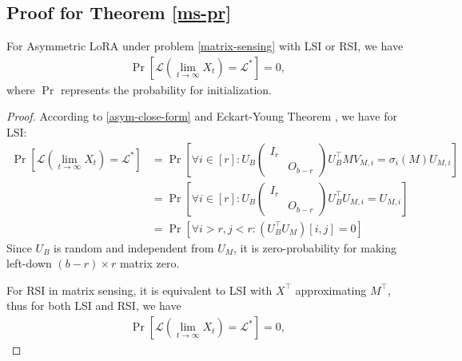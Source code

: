 \subsection{Proof for Theorem \ref{ms-pr}}
\label{ms-pr-proof}
\begin{theorem}
    For Asymmetric LoRA under problem \ref{matrix-sensing} with LSI or RSI, we have
    \begin{align*}
        \operatorname{Pr}\left[\mathcal{L}(\lim_{t\to\infty}X_t)=\mathcal{L}^*\right]=0,
    \end{align*}
    where $\operatorname{Pr}$ represents the probability for initialization. 
\end{theorem}
\begin{proof}
    According to \ref{asym-close-form} and Eckart-Young Theorem \cite{eckart1936approximation}, we have for LSI:
    \begin{align}
        \operatorname{Pr}\left[\mathcal{L}(\lim_{t\to\infty}X_t)=\mathcal{L}^*\right]
        &=\operatorname{Pr}\left[\forall i\in[r]:U_B\begin{pmatrix}
            I_r\\&O_{b-r}
        \end{pmatrix}U_B^\top MV_{M,i}=\sigma_i(M)U_{M,i}\right]\\
        &=\operatorname{Pr}\left[\forall i\in[r]:U_B\begin{pmatrix}
            I_r\\&O_{b-r}
        \end{pmatrix}U_B^\top U_{M,i}=U_{M,i}\right]\\
        &=\operatorname{Pr}\left[\forall i>r,j<r: (U_B^\top U_{M})[i,j]=0\right]
    \end{align}
    Since $U_B$ is random and independent from $U_M$, it is zero-probability for making left-down $(b-r)\times r$ matrix zero. 

    For RSI in matrix sensing, it is equivalent to LSI with $X^\top$ approximating $M^\top$, thus for both LSI and RSI, we have
    \begin{align*}
        \operatorname{Pr}\left[\mathcal{L}(\lim_{t\to\infty}X_t)=\mathcal{L}^*\right]=0,
    \end{align*}
\end{proof}


